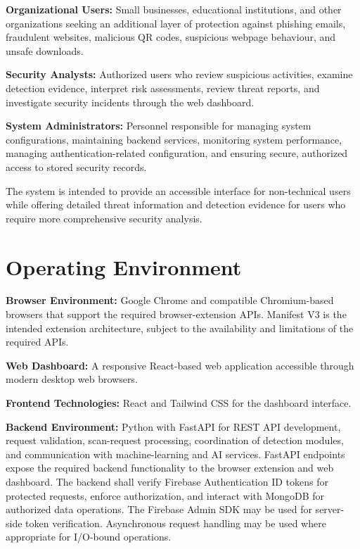 \documentclass[12pt,a4paper]{report}
\begin{document}
\textbf{Organizational Users:} Small businesses, educational institutions, and other organizations seeking an additional layer of protection against phishing emails, fraudulent websites, malicious QR codes, suspicious webpage behaviour, and unsafe downloads.\par

\textbf{Security Analysts:} Authorized users who review suspicious activities, examine detection evidence, interpret risk assessments, review threat reports, and investigate security incidents through the web dashboard.\par

\textbf{System Administrators:} Personnel responsible for managing system configurations, maintaining backend services, monitoring system performance, managing authentication-related configuration, and ensuring secure, authorized access to stored security records.\par

The system is intended to provide an accessible interface for non-technical users while offering detailed threat information and detection evidence for users who require more comprehensive security analysis.\par

\section{Operating Environment}

\textbf{Browser Environment:} Google Chrome and compatible Chromium-based browsers that support the required browser-extension APIs. Manifest V3 is the intended extension architecture, subject to the availability and limitations of the required APIs.\par

\textbf{Web Dashboard:} A responsive React-based web application accessible through modern desktop web browsers.\par

\textbf{Frontend Technologies:} React and Tailwind CSS for the dashboard interface.\par

\textbf{Backend Environment:} Python with FastAPI for REST API development, request validation, scan-request processing, coordination of detection modules, and communication with machine-learning and AI services. FastAPI endpoints expose the required backend functionality to the browser extension and web dashboard. The backend shall verify Firebase Authentication ID tokens for protected requests, enforce authorization, and interact with MongoDB for authorized data operations. The Firebase Admin SDK may be used for server-side token verification. Asynchronous request handling may be used where appropriate for I/O-bound operations.\par
\end{document}
